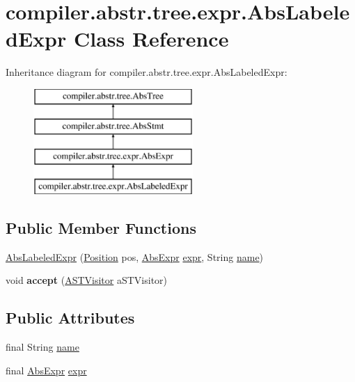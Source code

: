 \hypertarget{classcompiler_1_1abstr_1_1tree_1_1expr_1_1_abs_labeled_expr}{}\section{compiler.\+abstr.\+tree.\+expr.\+Abs\+Labeled\+Expr Class Reference}
\label{classcompiler_1_1abstr_1_1tree_1_1expr_1_1_abs_labeled_expr}
Inheritance diagram for compiler.\+abstr.\+tree.\+expr.\+Abs\+Labeled\+Expr\+:\begin{figure}[H]
\begin{center}
\leavevmode
\includegraphics[height=4.000000cm]{classcompiler_1_1abstr_1_1tree_1_1expr_1_1_abs_labeled_expr}
\end{center}
\end{figure}
\subsection*{Public Member Functions}
\begin{DoxyCompactItemize}
\item 
\hyperlink{classcompiler_1_1abstr_1_1tree_1_1expr_1_1_abs_labeled_expr_a5fe9902fca7a43556e10aa9540211757}{Abs\+Labeled\+Expr} (\hyperlink{classcompiler_1_1_position}{Position} pos, \hyperlink{classcompiler_1_1abstr_1_1tree_1_1expr_1_1_abs_expr}{Abs\+Expr} \hyperlink{classcompiler_1_1abstr_1_1tree_1_1expr_1_1_abs_labeled_expr_aad3b026976850f852529718c7d934b89}{expr}, String \hyperlink{classcompiler_1_1abstr_1_1tree_1_1expr_1_1_abs_labeled_expr_a0020acee7aed5fa9b375a152db90ae62}{name})
\item 
\mbox{\label{classcompiler_1_1abstr_1_1tree_1_1expr_1_1_abs_labeled_expr_a21bb6e604986202ca8a87d9f9d3e849d}} 
void {\bfseries accept} (\hyperlink{interfacecompiler_1_1abstr_1_1_a_s_t_visitor}{A\+S\+T\+Visitor} a\+S\+T\+Visitor)
\end{DoxyCompactItemize}
\subsection*{Public Attributes}
\begin{DoxyCompactItemize}
\item 
final String \hyperlink{classcompiler_1_1abstr_1_1tree_1_1expr_1_1_abs_labeled_expr_a0020acee7aed5fa9b375a152db90ae62}{name}
\item 
final \hyperlink{classcompiler_1_1abstr_1_1tree_1_1expr_1_1_abs_expr}{Abs\+Expr} \hyperlink{classcompiler_1_1abstr_1_1tree_1_1expr_1_1_abs_labeled_expr_aad3b026976850f852529718c7d934b89}{expr}
\end{DoxyCompactItemize}


